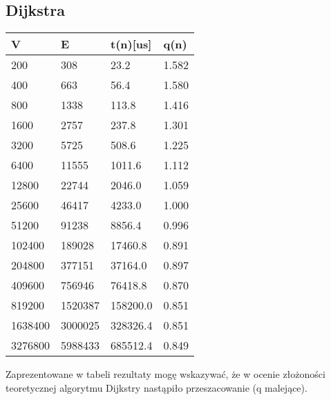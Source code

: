 \documentclass[11pt,a4paper]{article}
\begin{document}
\subsection{Dijkstra}
\begin{longtable}{| m{1.7cm}| m{1.7cm} | m{1.7cm} | m{1.2cm} |}
\hline
V    &      E    &      t(n)[us] &  q(n)  \\ \hline
200  &      308  &      23.2  &     1.582 \\ \hline
400  &      663  &      56.4  &     1.580 \\ \hline
800  &      1338  &     113.8  &    1.416 \\ \hline
1600  &     2757  &     237.8  &    1.301 \\ \hline
3200  &     5725  &     508.6  &    1.225 \\ \hline
6400  &     11555  &    1011.6  &   1.112 \\ \hline
12800  &    22744  &    2046.0  &   1.059 \\ \hline
25600  &    46417  &    4233.0  &   1.000 \\ \hline
51200  &    91238  &    8856.4  &   0.996 \\ \hline
102400  &   189028  &   17460.8  &  0.891 \\ \hline
204800  &   377151  &   37164.0  &  0.897 \\ \hline
409600  &   756946  &   76418.8  &  0.870 \\ \hline
819200  &   1520387  &  158200.0  & 0.851 \\ \hline
1638400  &  3000025  &  328326.4  & 0.851 \\ \hline
3276800  &  5988433  &  685512.4  & 0.849 \\ \hline
\end{longtable}

Zaprezentowane w tabeli rezultaty mogę wskazywać, że w ocenie złożoności teoretycznej algorytmu Dijkstry
nastąpiło przeszacowanie (q malejące).
\newpage
\end{document}
